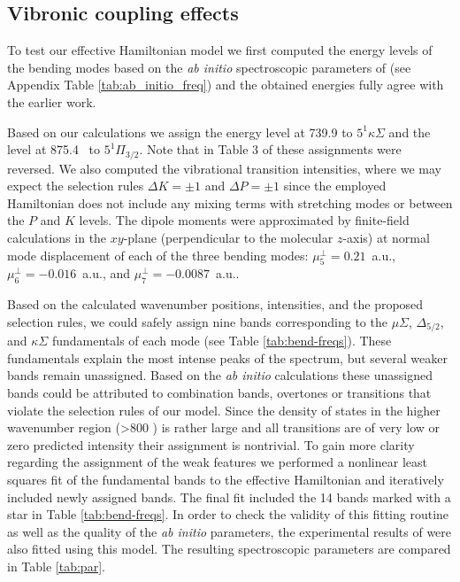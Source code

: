 \subsection{Vibronic coupling effects}
\label{sec:bend}
To test our effective Hamiltonian model we first computed the energy levels of the bending modes based on the \emph{ab initio} spectroscopic parameters of \citet{Dai2015TheCalculations} (see Appendix Table \ref{tab:ab_initio_freq}) and the obtained energies fully agree with the earlier work.
 
Based on our calculations we assign the energy level at 739.9 \wns to $5^1 \kappa \Sigma$ and the level at 875.4 \wn\ to $5^1 \Pi_{3/2}$.
Note that in Table 3 of \citet{Dai2015TheCalculations} these assignments were reversed.
We also computed the vibrational transition intensities, where we may expect the selection rules $\Delta K = \pm 1 $ and $\Delta P = \pm 1 $ since the employed Hamiltonian does not include any mixing terms with stretching modes or between the $P$ and $K$ levels. The dipole moments were approximated by finite-field calculations in the $xy$-plane (perpendicular to the molecular $z$-axis) at normal mode displacement of each of the three bending modes: $\mu^{\perp}_5=0.21$~a.u., $\mu^{\perp}_6=-0.016$~a.u., and $\mu^{\perp}_7=-0.0087$~a.u..   


Based on the calculated wavenumber positions, intensities, and the proposed selection rules, we could safely assign nine bands corresponding to the $\mu\Sigma$, $\Delta_{5/2}$, and $\kappa\Sigma$ fundamentals of each mode (see Table \ref{tab:bend-freqs}). 
These fundamentals explain the most intense peaks of the spectrum, but several weaker bands remain unassigned. 
Based on the \emph{ab initio} calculations these unassigned bands could be attributed to combination bands, overtones or transitions that violate the selection rules of our model. 
Since the density of states in the higher wavenumber region (>800 \wn) is rather large and all transitions are of very low or zero predicted intensity their assignment is nontrivial. 
To gain more clarity regarding the assignment of the weak features we performed a nonlinear least squares fit of the fundamental bands to the effective Hamiltonian and iteratively included newly assigned bands. The final fit included the 14 bands marked with a star in Table \ref{tab:bend-freqs}.
In order to check the validity of this fitting routine as well as the quality of the \emph{ab initio} parameters, the experimental results of \citet{Dai2015TheCalculations} were also fitted using this model. The resulting spectroscopic parameters are compared in Table \ref{tab:par}.


